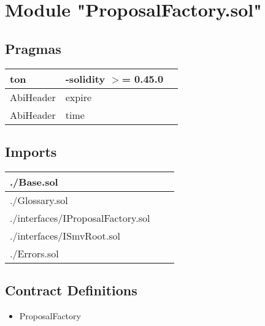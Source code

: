 
\section{Module "ProposalFactory.sol"}


\subsection{Pragmas}


\noindent\begin{tabular}{|l|l|p{5cm}|}\hline
ton & -solidity $>$= 0.45.0 &\\\hline
AbiHeader &  expire &\\\hline
AbiHeader &  time &\\\hline
\end{tabular}


\subsection{Imports}


\noindent\begin{tabular}{|l|l|p{5cm}|}\hline
./Base.sol &\\\hline
./Glossary.sol &\\\hline
./interfaces/IProposalFactory.sol &\\\hline
./interfaces/ISmvRoot.sol &\\\hline
./Errors.sol &\\\hline
\end{tabular}


\subsection{Contract Definitions}

\begin{itemize}
\item ProposalFactory
\end{itemize}
